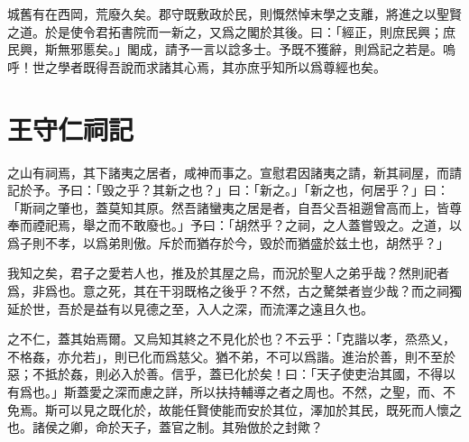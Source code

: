 城舊有在西岡，荒廢久矣。郡守既敷政於民，則慨然悼末學之支離，將進之以聖賢之道。於是使令君拓書院而一新之，又爲之閣於其後。曰：「經正，則庶民興；庶民興，斯無邪慝矣。」閣成，請予一言以諗多士。予既不獲辭，則爲記之若是。嗚呼！世之學者既得吾說而求諸其心焉，其亦庶乎知所以爲尊經也矣。%

\theendnotes

\section[象祠記\quad{\small 王守仁}]{{\normalsize 王守仁}\quad {}祠記}
之山有祠焉，其下諸夷之居者，咸神而{事}之。宣慰君因諸夷之請，新其祠屋，而請記於予。予曰：「毁之乎？其新之也？」曰：「新之。」「新之也，何居乎？」曰：「斯祠之肇也，蓋莫知其原。然吾諸蠻夷之居是者，自吾父吾祖遡曾高而上，皆尊奉而禋祀焉，舉{之}而不敢廢也。」予曰：「胡然乎？之{祠}，之人蓋嘗毁之。之道，以爲子則不孝，以爲弟則傲。斥於而猶存於今，毁於而猶盛於兹土也，胡然乎？」%

我知之矣，君子之愛若人也，推及於其屋之烏，而況於聖人之弟乎哉？然則{祀}者爲，非爲也。意之死，其在干羽既格之後乎？不然，古之驁桀者豈少哉？而之祠獨延於世，吾於是益有以見德之至，入人之深，而流澤之遠且久也。%

之不仁，蓋其始焉爾。又烏知其終之不見化於也？不云乎：「克諧以孝，烝烝乂，不格姦，亦允若」，則已化而爲慈父。猶不弟，不可以爲諧。進治於善，則不至於惡；不抵於姦，則必入於善。信乎，蓋已化於矣！曰：「天子使吏治其國，不得以有爲也。」斯蓋愛之深而慮之詳，所以扶持輔導之者之周也。不然，之聖，而、不免焉。斯可以見之既化於，故能任賢使能而安於其位，澤加於其民，既死而人懷之也。諸侯之卿，命於天子，蓋官之制。其殆倣於之封歟？%


